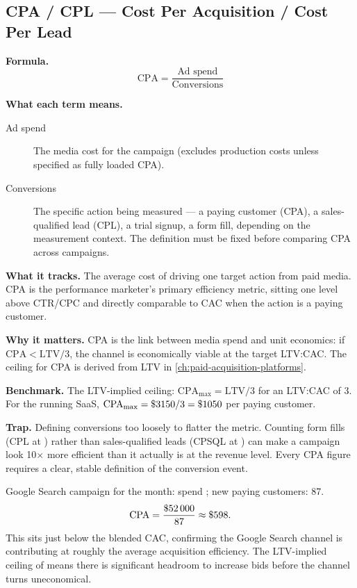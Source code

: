 \subsection{CPA / CPL --- Cost Per Acquisition / Cost Per Lead}

\textbf{Formula.}
\[
  \mathrm{CPA} = \frac{\text{Ad spend}}{\text{Conversions}}
\]

\textbf{What each term means.}
\begin{description}
  \item[Ad spend] The media cost for the campaign (excludes production costs unless specified
    as fully loaded CPA).
  \item[Conversions] The specific action being measured --- a paying customer (CPA), a
    sales-qualified lead (CPL), a trial signup, a form fill, depending on the measurement
    context. The definition must be fixed before comparing CPA across campaigns.
\end{description}

\textbf{What it tracks.} The average cost of driving one target action from paid media.
CPA is the performance marketer's primary efficiency metric, sitting one level above CTR/CPC
and directly comparable to CAC when the action is a paying customer.

\textbf{Why it matters.} CPA is the link between media spend and unit economics: if
$\mathrm{CPA} < \mathrm{LTV}/3$, the channel is economically viable at the target LTV:CAC.
The ceiling for CPA is derived from LTV in \cref{ch:paid-acquisition-platforms}.

\textbf{Benchmark.} The LTV-implied ceiling: $\mathrm{CPA}_{\max} = \mathrm{LTV} / 3$ for
an LTV:CAC of 3. For the running SaaS, $\mathrm{CPA}_{\max} = \$\num{3150}/3 = \$\num{1050}$
per paying customer.

\textbf{Trap.} Defining conversions too loosely to flatter the metric. Counting form fills
(CPL at ) rather than sales-qualified leads (CPSQL at ) can make a
campaign look 10$\times$ more efficient than it actually is at the revenue level. Every CPA
figure requires a clear, stable definition of the conversion event.

\begin{example}
Google Search campaign for the month: spend ; new paying customers: 87.
\[
  \mathrm{CPA} = \frac{\$\num{52000}}{87} \approx \$\num{598}.
\]
This sits just below the  blended CAC, confirming the Google Search channel is
contributing at roughly the average acquisition efficiency. The LTV-implied ceiling of
 means there is significant headroom to increase bids before the channel turns
uneconomical.
\end{example}


